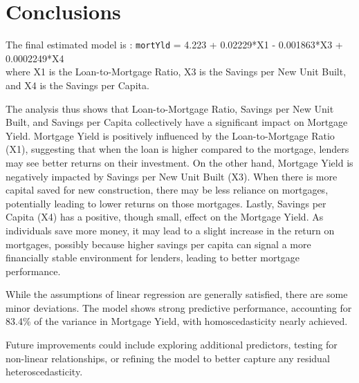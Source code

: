 \documentclass[
  11pt,
]{article}
\begin{document}
\section{Conclusions}\label{conclusions}

\hfill\break
The final estimated model is : \texttt{mortYld} = 4.223 + 0.02229*X1 -
0.001863*X3 + 0.0002249*X4\\
where X1 is the Loan-to-Mortgage Ratio, X3 is the Savings per New Unit
Built, and X4 is the Savings per Capita.

The analysis thus shows that Loan-to-Mortgage Ratio, Savings per New
Unit Built, and Savings per Capita collectively have a significant
impact on Mortgage Yield. Mortgage Yield is positively influenced by the
Loan-to-Mortgage Ratio (X1), suggesting that when the loan is higher
compared to the mortgage, lenders may see better returns on their
investment. On the other hand, Mortgage Yield is negatively impacted by
Savings per New Unit Built (X3). When there is more capital saved for
new construction, there may be less reliance on mortgages, potentially
leading to lower returns on those mortgages. Lastly, Savings per Capita
(X4) has a positive, though small, effect on the Mortgage Yield. As
individuals save more money, it may lead to a slight increase in the
return on mortgages, possibly because higher savings per capita can
signal a more financially stable environment for lenders, leading to
better mortgage performance.

While the assumptions of linear regression are generally satisfied,
there are some minor deviations. The model shows strong predictive
performance, accounting for 83.4\% of the variance in Mortgage Yield,
with homoscedasticity nearly achieved.

Future improvements could include exploring additional predictors,
testing for non-linear relationships, or refining the model to better
capture any residual heteroscedasticity.
\end{document}

